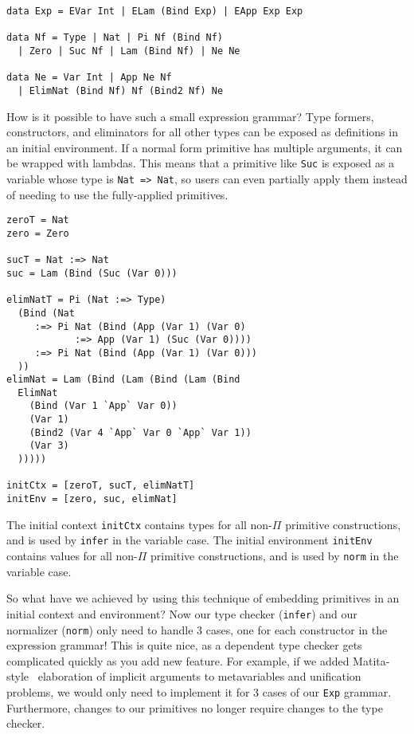\documentclass[preprint,authoryear]{sigplanconf}
\begin{document}
\begin{verbatim}
data Exp = EVar Int | ELam (Bind Exp) | EApp Exp Exp

data Nf = Type | Nat | Pi Nf (Bind Nf)
  | Zero | Suc Nf | Lam (Bind Nf) | Ne Ne

data Ne = Var Int | App Ne Nf
  | ElimNat (Bind Nf) Nf (Bind2 Nf) Ne
\end{verbatim}

How is it possible to have such a small expression grammar? Type
formers, constructors, and eliminators for all other types can be
exposed as definitions in an initial environment. If a normal form
primitive has multiple arguments, it can be wrapped with lambdas. This
means that a primitive like \texttt{Suc} is exposed as a variable
whose type is \texttt{Nat => Nat}, so users can even partially apply
them instead of needing to use the fully-applied primitives. 

\begin{verbatim}
zeroT = Nat
zero = Zero

sucT = Nat :=> Nat
suc = Lam (Bind (Suc (Var 0)))

elimNatT = Pi (Nat :=> Type)
  (Bind (Nat
     :=> Pi Nat (Bind (App (Var 1) (Var 0)
            :=> App (Var 1) (Suc (Var 0))))
     :=> Pi Nat (Bind (App (Var 1) (Var 0)))
  ))
elimNat = Lam (Bind (Lam (Bind (Lam (Bind
  ElimNat
    (Bind (Var 1 `App` Var 0))
    (Var 1)
    (Bind2 (Var 4 `App` Var 0 `App` Var 1))
    (Var 3)
  )))))

initCtx = [zeroT, sucT, elimNatT]
initEnv = [zero, suc, elimNat]
\end{verbatim}

The initial context \texttt{initCtx} contains types for all
non-$\Pi$ primitive constructions, and is used by \texttt{infer} in the
variable case.
The initial environment \texttt{initEnv} contains values for all
non-$\Pi$ primitive constructions, and is used by \texttt{norm} in the
variable case.

So what have we achieved by using this technique of embedding primitives
in an initial context and environment? Now our type checker
(\texttt{infer}) and our normalizer (\texttt{norm}) only need to
handle 3 cases, one for each constructor in the expression grammar!
This is quite nice, as a dependent type checker gets complicated
quickly as you add new feature. For example, if we added
Matita-style~\cite{TODO} elaboration of implicit arguments to
metavariables and unification problems, we would only need to
implement it for 3 cases of our \texttt{Exp} grammar.
Furthermore, changes to our primitives no longer require changes to
the type checker.
\end{document}
